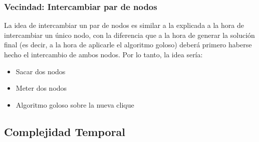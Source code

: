 \subsubsection{Vecindad: Intercambiar par de nodos}
La idea de intercambiar un par de nodos es similar a la explicada a la hora de intercambiar un único nodo, con la diferencia que a la hora de generar la solución final (es decir, a la hora de aplicarle el algoritmo goloso) deberá primero haberse hecho el intercambio de ambos nodos. Por lo tanto, la idea sería:
\begin{itemize}
	\item Sacar dos nodos
	\item Meter dos nodos
	\item Algoritmo goloso sobre la nueva clique
\end{itemize}

\subsection{Complejidad Temporal}


